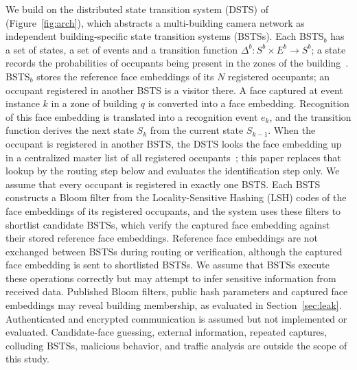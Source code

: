\documentclass[pdflatex,sn-mathphys-num]{sn-jnl}%
\theoremstyle{thmstyleone}%
\theoremstyle{thmstyletwo}%
\theoremstyle{thmstylethree}%
\begin{document}
We build on the distributed state transition system (DSTS) of~\cite{mohan2020} (Figure~\ref{fig:arch}), which abstracts a multi-building camera network as independent building-specific state transition systems (BSTSs). Each BSTS$_b$ has a set of states, a set of events and a transition function $\Delta^b:S^b\times E^b\to S^b$; a state records the probabilities of occupants being present in the zones of the building~\cite{mohan2020,MJG2011}. BSTS$_b$ stores the reference face embeddings of its $N$ registered occupants; an occupant registered in another BSTS is a visitor there. A face captured at event instance $k$ in a zone of building $q$ is converted into a face embedding. Recognition of this face embedding is translated into a recognition event $e_k$, and the transition function derives the next state $S_k$ from the current state $S_{k-1}$. When the occupant is registered in another BSTS, the DSTS looks the face embedding up in a centralized master list of all registered occupants~\cite{mohan2020}; this paper replaces that lookup by the routing step below and evaluates the identification step only. We assume that every occupant is registered in exactly one BSTS. Each BSTS constructs a Bloom filter from the Locality-Sensitive Hashing (LSH) codes of the face embeddings of its registered occupants, and the system uses these filters to shortlist candidate BSTSs, which verify the captured face embedding against their stored reference face embeddings. Reference face embeddings are not exchanged between BSTSs during routing or verification, although the captured face embedding is sent to shortlisted BSTSs. We assume that BSTSs execute these operations correctly but may attempt to infer sensitive information from received data. Published Bloom filters, public hash parameters and captured face embeddings may reveal building membership, as evaluated in Section~\ref{sec:leak}. Authenticated and encrypted communication is assumed but not implemented or evaluated. Candidate-face guessing, external information, repeated captures, colluding BSTSs, malicious behavior, and traffic analysis are outside the scope of this study.
\end{document}

